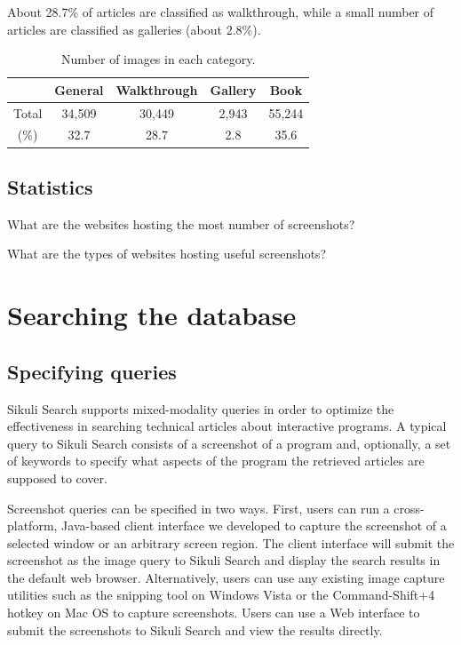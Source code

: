 \documentclass{www2010-submission}
\begin{document}
About 28.7\% of articles are classified as walkthrough, while a
small number of articles are classified as galleries (about 2.8\%).

\begin{table}
\centering \caption{Number of images in each category.} \label{}

\begin{tabular}{|c|c|c|c|c|}
\hline
      & General & Walkthrough & Gallery & Book \\
\hline
Total & 34,509 & 30,449 & 2,943 & 55,244\\
 \hline
(\%)  & 32.7 & 28.7 & 2.8 & 35.6 \\
\hline
\end{tabular}
\end{table}

\subsection{Statistics}

What are the websites hosting the most number of screenshots?

What are the types of websites hosting useful screenshots?


\section{Searching the database}

\subsection{Specifying queries}

Sikuli Search supports mixed-modality queries in order to optimize
the effectiveness in searching technical articles about
interactive programs. A typical query to Sikuli Search consists of
a screenshot of a program and, optionally, a set of keywords to
specify what aspects of the program the retrieved articles are
supposed to cover.

Screenshot queries can be specified in two ways. First, users can
run a cross-platform, Java-based client interface we developed to
capture the screenshot of a selected window or an arbitrary screen
region. The client interface will submit the screenshot as the
image query to Sikuli Search and display the search results in the
default web browser. Alternatively, users can use any existing
image capture utilities such as the snipping tool on Windows Vista
or the Command-Shift+4 hotkey on Mac OS to capture screenshots.
Users can use a Web interface to submit the screenshots to Sikuli
Search and view the results directly.
\end{document}
